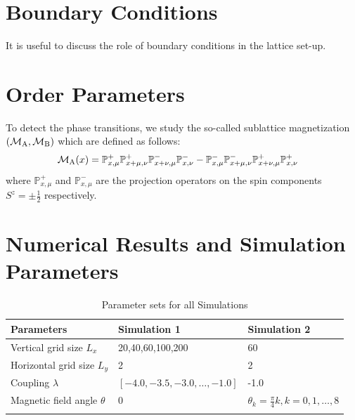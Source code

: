 \documentclass[12pt, a4paper, twoside, titlepage]{article}
\newcommand{\M}[1]{\ensuremath{\mathcal{M}_{\rm #1}}}
\newcommand{\Pp}[1]{\ensuremath{\mathbb{P}^{+}_{#1}}}
\newcommand{\Pm}[1]{\ensuremath{\mathbb{P}^{-}_{#1}}}
\begin{document}
\section{Boundary Conditions}
  It is useful to discuss the role of boundary conditions in the lattice set-up.

\section{Order Parameters}
 To detect the phase transitions, we study the so-called sublattice
 magnetization $( \M{A}, \M{B})$ which are defined as follows:
 \begin{align}
	 \M{A}(x) &= \Pp{x,\mu} \Pp{x+\mu,\nu} \Pm{x+\nu,\mu} \Pm{x,\nu} -
          \Pm{x,\mu} \Pm{x+\mu,\nu} \Pp{x+\nu,\mu} \Pp{x,\nu}
 \end{align}
 where $\Pp{x,\mu}$ and $\Pm{x,\mu}$ are the projection operators
 on the spin components $S^z = \pm \frac{1}{2}$ respectively.


\newpage
\section{Numerical Results and Simulation Parameters}

\begin{table}[htp!]
\centering
\caption{Parameter sets for all Simulations}
\smallskip
{}
\begin{tabular}{l l l}
\toprule
Parameters & \multicolumn{1}{l}{Simulation 1} & \multicolumn{1}{l}{Simulation 2} \\
\midrule
\rowcolor[gray]{.9}
Vertical grid size $L_x$ & {20,40,60,100,200} & 60\\
Horizontal grid size $L_y$           & 2 & 2 \\
\rowcolor[gray]{.9}
Coupling $\lambda$ & $[-4.0,-3.5,-3.0,\dots,-1.0]$ & -1.0\\
Magnetic field angle $\theta$       & 0 & $\theta_k =\frac{\pi}{4}k, k = 0,1,\dots,8$ \\
\rowcolor[gray]{.9}
\bottomrule
\end{tabular}
\end{table}
\end{document}
